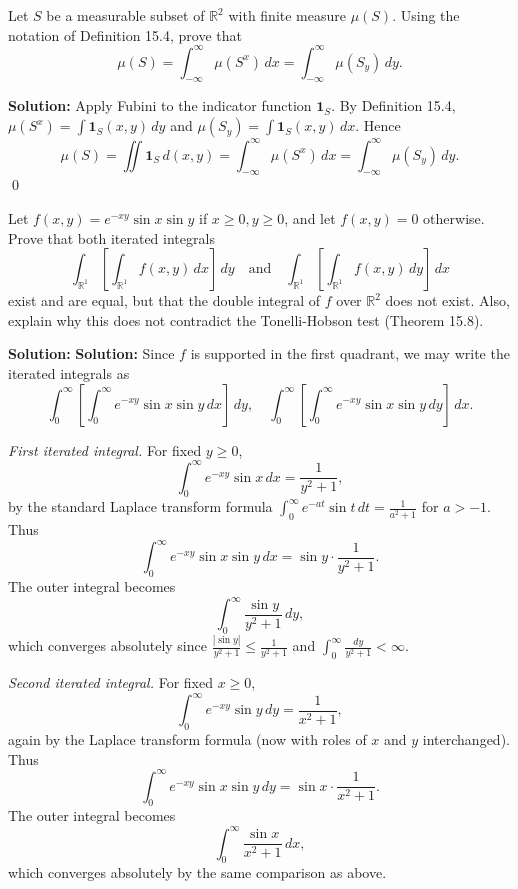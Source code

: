 \begin{problembox}
Let \( S \) be a measurable subset of \( \mathbb{R}^2 \) with finite measure \( \mu(S) \). Using the notation of Definition 15.4, prove that
\[
\mu(S) = \int_{-\infty}^{\infty} \mu(S^x) \, dx = \int_{-\infty}^{\infty} \mu(S_y) \, dy.
\]
\end{problembox}

\noindent\textbf{Solution:}
Apply Fubini to the indicator function \(\mathbf{1}_S\). By Definition 15.4, \(\mu(S^x)=\int \mathbf{1}_S(x,y)\,dy\) and \(\mu(S_y)=\int \mathbf{1}_S(x,y)\,dx\). Hence
\[
\mu(S)=\iint \mathbf{1}_S\,d(x,y)=\int_{-\infty}^{\infty}\!\mu(S^x)\,dx=\int_{-\infty}^{\infty}\!\mu(S_y)\,dy.
\]\qed


\begin{problembox}
Let \( f(x, y) = e^{-xy} \sin x \sin y \) if \( x \geq 0, y \geq 0 \), and let \( f(x, y) = 0 \) otherwise. Prove that both iterated integrals
\[
\int_{\mathbb{R}^1} \left[ \int_{\mathbb{R}^1} f(x, y) \, dx \right] \, dy \quad \text{and} \quad \int_{\mathbb{R}^1} \left[ \int_{\mathbb{R}^1} f(x, y) \, dy \right] \, dx
\]
exist and are equal, but that the double integral of \( f \) over \( \mathbb{R}^2 \) does not exist. Also, explain why this does not contradict the Tonelli-Hobson test (Theorem 15.8).
\end{problembox}

\noindent\textbf{Solution:}
\textbf{Solution:}
Since \(f\) is supported in the first quadrant, we may write the iterated integrals as
\[
\int_0^\infty \left[ \int_0^\infty e^{-xy} \sin x \sin y \, dx \right] \, dy,
\quad
\int_0^\infty \left[ \int_0^\infty e^{-xy} \sin x \sin y \, dy \right] \, dx.
\]

\emph{First iterated integral.}
For fixed \(y \ge 0\),
\[
\int_0^\infty e^{-xy} \sin x \, dx
= \frac{1}{y^2+1},
\]
by the standard Laplace transform formula 
\(\int_0^\infty e^{-at} \sin t\, dt = \frac{1}{a^2+1}\) for \(a > -1\).
Thus
\[
\int_0^\infty e^{-xy} \sin x \sin y \, dx
= \sin y \cdot \frac{1}{y^2+1}.
\]
The outer integral becomes
\[
\int_0^\infty \frac{\sin y}{y^2+1} \, dy,
\]
which converges absolutely since \(\frac{|\sin y|}{y^2+1} \le \frac{1}{y^2+1}\) and \(\int_0^\infty \frac{dy}{y^2+1} < \infty\).

\emph{Second iterated integral.}
For fixed \(x \ge 0\),
\[
\int_0^\infty e^{-xy} \sin y \, dy
= \frac{1}{x^2+1},
\]
again by the Laplace transform formula (now with roles of \(x\) and \(y\) interchanged).
Thus
\[
\int_0^\infty e^{-xy} \sin x \sin y \, dy
= \sin x \cdot \frac{1}{x^2+1}.
\]
The outer integral becomes
\[
\int_0^\infty \frac{\sin x}{x^2+1} \, dx,
\]
which converges absolutely by the same comparison as above.  

